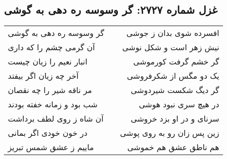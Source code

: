 \begin{center}
\section*{غزل شماره ۲۷۲۷: گر وسوسه ره دهی به گوشی}
\label{sec:2727}
\begin{longtable}{l p{0.5cm} r}
گر وسوسه ره دهی به گوشی
&&
افسرده شوی بدان ز جوشی
\\
آن گرمی چشم را که داری
&&
نیش زهر است و شکل نوشی
\\
انبار نعیم را زیان چیست
&&
گر خشم گرفت کورموشی
\\
آخر چه زیان اگر بیفتد
&&
یک دو مگس از شکرفروشی
\\
مر ناقه شیر را چه نقصان
&&
گر دیگ شکست شیردوشی
\\
شب بود و زمانه خفته بودند
&&
در هیچ سری نبود هوشی
\\
آن شاه ز روی لطف برداشت
&&
سرنای و در او بزد خروشی
\\
در خون خودی اگر بمانی
&&
زین پس زان رو به روی پوشی
\\
ماییم ز عشق شمس تبریز
&&
هم ناطق عشق هم خموشی
\\
\end{longtable}
\end{center}
